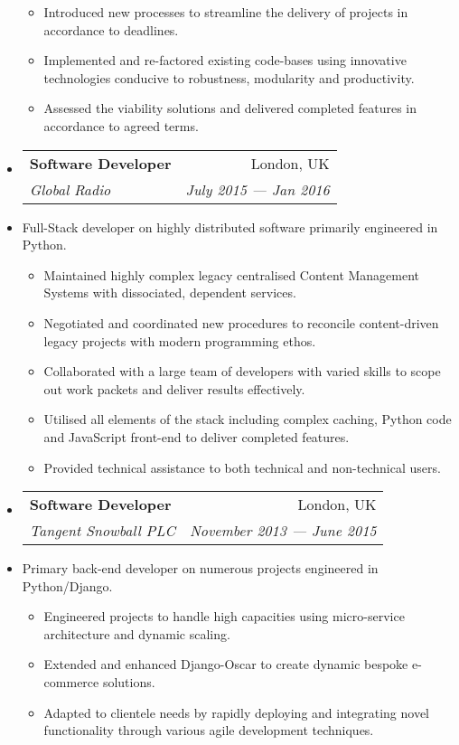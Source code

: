 \documentclass[letterpaper,11pt]{article}
\makeatletter
\newcommand{\ressubheading}[4]
    {\begin{tabular*}{180mm}{l@{\extracolsep{\fill}}r}
        \textbf{#1} & #2 \\
        \textit{#3} & \textit{#4} \\
    \end{tabular*}\vspace{-6pt}}
\newcommand{\resdescription}[1]{#1 \vspace{-0mm}}
\newcommand{\resitem}[1]{\item #1 \vspace{-2pt}}
\makeatother
\begin{document}
\begin{itemize}
\begin{itemize}
                    \resitem{Introduced new processes to streamline the delivery of projects in accordance to deadlines.}
                    \resitem{Implemented and re-factored existing code-bases using innovative technologies conducive to robustness, modularity and productivity.}
                    \resitem{Assessed the viability solutions and delivered completed features in accordance to agreed terms.}
            \end{itemize}
        \item[]
            \ressubheading{Software Developer}{London, UK}{Global Radio}{July 2015 --- Jan 2016}
        \item[]
            \resdescription{Full-Stack developer on highly distributed software primarily engineered in Python.}
            \begin{itemize}
                    \resitem{Maintained highly complex legacy centralised Content Management Systems with dissociated, dependent services.}
                    \resitem{Negotiated and coordinated new procedures to reconcile content-driven legacy projects with modern programming ethos.}
                    \resitem{Collaborated with a large team of developers with varied skills to scope out work packets and deliver results effectively.}
                    \resitem{Utilised all elements of the stack including complex caching, Python code and JavaScript front-end to deliver completed features.}
                    \resitem{Provided technical assistance to both technical and non-technical users.}
            \end{itemize}


        \item[]
            \ressubheading{Software Developer}{London, UK}{Tangent Snowball PLC}{November 2013 --- June 2015}
        \item[]
            \resdescription{Primary back-end developer on numerous projects engineered in Python/Django.}
            \begin{itemize}
                    \resitem{Engineered projects to handle high capacities using micro-service architecture and dynamic scaling.}
                    \resitem{Extended and enhanced Django-Oscar to create dynamic bespoke e-commerce solutions.}
                    \resitem{Adapted to clientele needs by rapidly deploying and integrating novel functionality through various agile development techniques.}
            \end{itemize}


\end{itemize}
\end{document}
